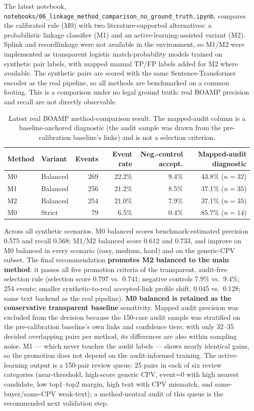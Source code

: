 \documentclass[11pt,a4paper]{article}
\begin{document}
The latest notebook,
\nolinkurl{notebooks/06_linkage_method_comparison_no_ground_truth.ipynb},
compares the calibrated rule (M0) with two literature-supported
alternatives: a probabilistic linkage classifier (M1) and an
active-learning-assisted variant (M2). Splink and recordlinkage were not
available in the environment, so M1/M2 were implemented as transparent
logistic match-probability models trained on synthetic pair labels, with mapped
manual TP/FP labels added for M2 where available. The synthetic pairs are
scored with the same Sentence-Transformer encoder as the real pipeline, so all
methods are benchmarked on a common footing. This is a comparison under
no legal ground truth: real BOAMP precision and recall are not directly
observable.

\begin{table}[H]
\centering
\caption{Latest real BOAMP method-comparison result. The mapped-audit column
is a baseline-anchored diagnostic (the audit sample was drawn from the
pre-calibration baseline's links) and is not a selection criterion.}
\label{tab:exec-method-comparison}
\small
\begin{tabular}{llrrrr}
\toprule
Method & Variant & Events & Event rate & Neg.-control accept. & Mapped-audit diagnostic \\
\midrule
M0 & Balanced & 269 & 22.2\% & 9.4\% & 43.8\% ($n{=}32$) \\
M1 & Balanced & 256 & 21.2\% & 8.5\% & 37.1\% ($n{=}35$) \\
M2 & Balanced & 254 & 21.0\% & 7.9\% & 37.1\% ($n{=}35$) \\
M0 & Strict   &  79 &  6.5\% & 0.4\% & 85.7\% ($n{=}14$) \\
\bottomrule
\end{tabular}
\end{table}

Across all synthetic scenarios, M0 balanced scores benchmark-estimated
precision 0.575 and recall 0.568; M1/M2 balanced score 0.612 and 0.733, and
improve on M0 balanced in every scenario (easy, medium, hard) and on the
generic-CPV subset. The final recommendation \textbf{promotes M2 balanced to
the main method}: it passes all five promotion criteria of the transparent,
audit-free selection rule (selection score 0.797 vs.\ 0.741; negative controls
7.9\% vs.\ 9.4\%; 254 events; smaller synthetic-to-real accepted-link profile
shift, 0.045 vs.\ 0.128; same text backend as the real pipeline).
\textbf{M0 balanced is retained as the conservative transparent baseline}
sensitivity. Mapped audit precision was excluded from the decision because the
150-case audit sample was stratified on the pre-calibration baseline's own
links and confidence tiers; with only 32--35 decided overlapping pairs per
method, its differences are also within sampling noise. M1 --- which never
touches the audit labels --- shows nearly identical gains, so the promotion
does not depend on the audit-informed training. The active-learning output is
a 150-pair review queue: 25 pairs in each of six review categories
(near-threshold, high-score generic CPV, event=0 with high nearest candidate,
low top1--top2 margin, high text with CPV mismatch, and same-buyer/same-CPV
weak-text); a method-neutral audit of this queue is the recommended next
validation step.
\end{document}
